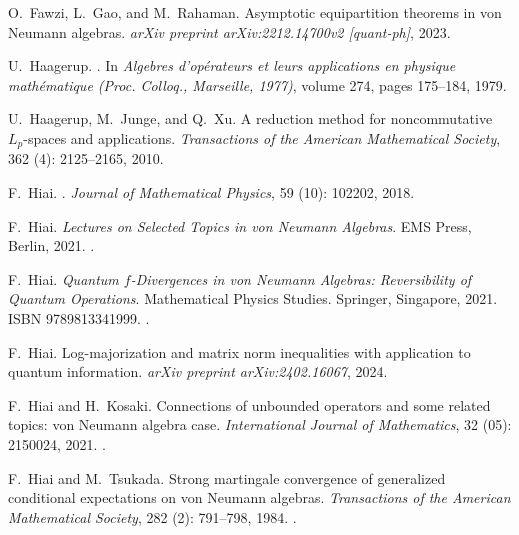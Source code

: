 \documentclass[12pt]{article}
\theoremstyle{definition}
\theoremstyle{remark}
\numberwithin{equation}{section}
\begin{document}
\begin{thebibliography}{27}
O.~Fawzi, L.~Gao, and M.~Rahaman.
\newblock Asymptotic equipartition theorems in von Neumann algebras.
\newblock \emph{arXiv preprint arXiv:2212.14700v2 [quant-ph]}, 2023.

U.~Haagerup.
.
\newblock In \emph{Algebres d'op{\'e}rateurs et leurs applications en
  physique math{\'e}matique (Proc. Colloq., Marseille, 1977)}, volume 274,
  pages 175--184, 1979.
  
U.~Haagerup, M.~Junge, and Q.~Xu.
\newblock A reduction method for noncommutative $L_p$-spaces and applications.
\newblock \emph{Transactions of the American Mathematical Society}, 362
  (4): 2125--2165, 2010.

F.~Hiai.
.
\newblock \emph{Journal of Mathematical Physics}, 59 (10):
  102202, 2018.

F.~Hiai.
\newblock \emph{Lectures on Selected Topics in von Neumann Algebras}.
\newblock EMS Press, Berlin, 2021{}.
\newblock {}.

F.~Hiai.
\newblock \emph{Quantum $f$-Divergences in von Neumann Algebras: Reversibility
  of Quantum Operations}.
\newblock Mathematical Physics Studies. Springer, Singapore,
  2021{}.
\newblock ISBN 9789813341999.
\newblock {}.

F.~Hiai.
\newblock Log-majorization and matrix norm inequalities with application to quantum
information.
\newblock \emph{arXiv preprint arXiv:2402.16067}, 2024.

F.~Hiai and H.~Kosaki.
\newblock Connections of unbounded operators and some related topics: von
  {N}eumann algebra case.
\newblock \emph{International Journal of Mathematics}, 32
  (05): 2150024, 2021.
\newblock {}.

F.~Hiai and M.~Tsukada.
\newblock Strong martingale convergence of generalized conditional expectations
  on von {N}eumann algebras.
\newblock \emph{Transactions of the American Mathematical Society},
  282 (2): 791--798, 1984.
\newblock {}.


\end{thebibliography}
\end{document}
